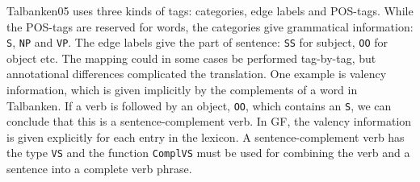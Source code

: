 \documentclass[runningheads,a4paper]{llncs}
\begin{document}
Talbanken05 uses three kinds of tags: categories, edge labels and POS-tags. 
While the POS-tags are reserved for words, the categories give grammatical information:
 \verb|S|, \verb|NP| and \verb|VP|.
The edge labels give the part of sentence: \verb|SS| for subject, 
\verb|OO| for object etc. 
%
The mapping could in some cases be performed tag-by-tag, but annotational
differences complicated the translation.
One example is valency information, which is given implicitly by the complements
of a word in Talbanken. If a verb is followed by an object, \verb-OO-, which contains an
\verb-S-, we can conclude that this is a sentence-complement verb.
In GF, the valency information is given explicitly for each entry in the lexicon.
A sentence-complement verb has the type \verb-VS- and the 
function \verb-ComplVS-  must be used for combining the verb and  a 
sentence into a complete verb phrase.

\end{document}
